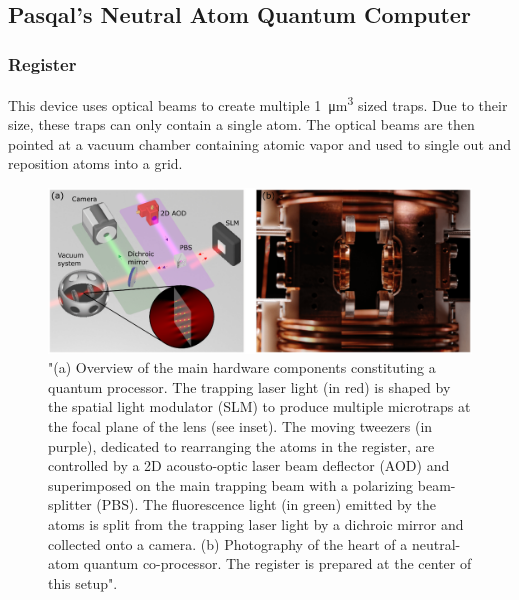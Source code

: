 \subsection{Pasqal's Neutral Atom Quantum Computer}
\label{sec:NAQC}
\subsubsection{Register}
This device uses optical beams to create multiple \SI{1}{\micro\meter\cubed} sized traps\cite{schlosserSubpoissonianLoadingSingle2001}.
Due to their size, these traps can only contain a single atom. The optical beams are then pointed at a vacuum chamber containing atomic vapor and used to single out and reposition atoms into a grid.
\begin{figure}[h]
  \centering
  \includegraphics[width=170mm]{./Images/registerHardware.png}
  \caption{"(a) Overview of the main hardware components constituting a quantum processor. The trapping laser light (in red) is shaped by the spatial light modulator (SLM) to produce multiple microtraps at the focal plane of the lens (see inset). The moving tweezers (in purple), dedicated to rearranging the atoms in the register, are controlled by a 2D acousto-optic laser beam deflector (AOD) and superimposed on the main trapping beam with a polarizing beam-splitter (PBS). The fluorescence light (in green) emitted by the atoms is split from the trapping laser light by a dichroic mirror and collected onto a camera. (b) Photography of the heart of a neutral-atom quantum co-processor. The register is prepared at the center of this setup".\cite{henrietQuantumComputingNeutral2020}} 
  \label{fig:hardwareregister}
\end{figure}
\newpage
